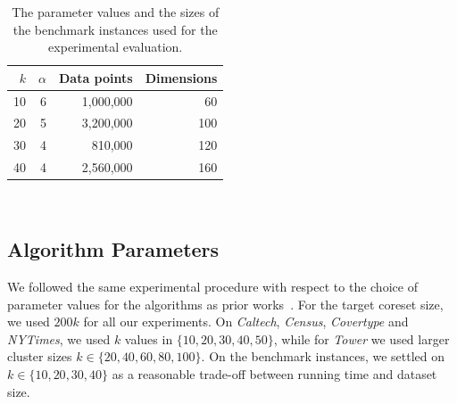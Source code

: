 %
\begin{table}
	\begin{center}%
	\caption{The parameter values and the sizes of the benchmark instances used for the experimental evaluation.}
	\label{tab:benchmark-instances-overview}
	\begin{tabular}{rrrr}
		\toprule
        $k$
		    & $\alpha$
		    & Data points
		    & Dimensions
            \\
		\midrule
        10
    		& 6
    		& 1,000,000
    		& 60
    		\\
        20
    		& 5
    		& 3,200,000
    		& 100
    		\\
        30
    		& 4
    		& 810,000
    		& 120
    		\\
        40
    		& 4
    		& 2,560,000
    		& 160
    		\\
		\bottomrule
	\end{tabular}\\
	\end{center}
\end{table}

\subsection{Algorithm Parameters}
We followed the same experimental procedure with respect to the choice of parameter values for the algorithms as prior works~\cite{AckermannMRSLS12, FGSSS13}. For the target coreset size, we used $200k$ for all our experiments. On \textit{Caltech}, \textit{Census},  \textit{Covertype} and \textit{NYTimes}, we used $k$ values in $\{10, 20, 30, 40, 50\}$, while for \textit{Tower} we used larger cluster sizes $k \in \{20, 40, 60, 80, 100\}$. On the benchmark instances, we settled on $k \in \{10, 20, 30, 40\}$ as a reasonable trade-off between running time and dataset size.



